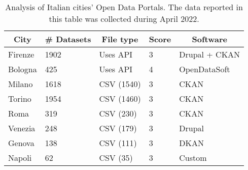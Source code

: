 \begin{table}[!ht]
  \onehalfspacing
  \centering
  \begin{tabular}{|l|l|l|l|l|}
    \hline
    \multicolumn{1}{|c|}{\textbf{City}} & \multicolumn{1}{c|}{\textbf{\# Datasets}} & \multicolumn{1}{c|}{\textbf{File type}} & \multicolumn{1}{c|}{\textbf{Score}} & \multicolumn{1}{c|}{\textbf{Software}} \\ \hline
    Firenze                   & 1902                                             & Uses \acs{API}                                       & 3                                   & Drupal + CKAN \\ \hline
    Bologna                   & 425                                              & Uses \acs{API}                                       & 4                                   & OpenDataSoft  \\ \hline
    Milano                    & 1618                                             & CSV (1540)                                           & 3                                   & CKAN  \\ \hline
    Torino                    & 1954                                             & CSV (1460)                                           & 3                                   & CKAN  \\ \hline
    Roma                      & 319                                              & CSV (230)                                            & 3                                   & CKAN  \\ \hline
    Venezia                   & 248                                              & CSV (179)                                            & 3                                   & Drupal  \\ \hline
    Genova                    & 138                                              & CSV (111)                                            & 3                                   & DKAN  \\ \hline
    Napoli                    & 62                                               & CSV (35)                                             & 3                                   & Custom  \\ \hline
  \end{tabular}
  \caption{Analysis of Italian cities' Open Data Portals. The data reported in this table was collected during April 2022.}
  \label{tab:italian-cities}
\end{table}

